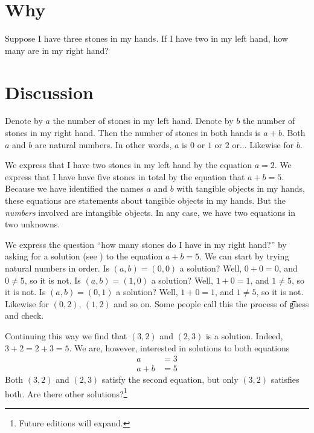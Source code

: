 
\section*{Why}

Suppose I have three stones in my hands.
If I have two in my left hand, how many are in my right hand?

\section*{Discussion}

Denote by $a$ the number of stones in my left hand.
Denote by $b$ the number of stones in my right hand.
Then the number of stones in both hands is $a + b$.
Both $a$ and $b$ are natural numbers.
In other words, $a$ is $0$ or $1$ or $2$ or...
Likewise for $b$.

We express that I have two stones in my left hand by the equation $a = 2$.
We express that I have have five stones in total by the equation that $a + b = 5$.
Because we have identified the names $a$ and $b$ with tangible objects in my hands, these equations are statements about tangible objects in my hands.
But the \textit{numbers} involved are intangible objects.
In any case, we have two equations in two unknowns.

We express the question ``how many stones do I have in my right hand?'' by asking for a solution (see ) to the equation $a + b = 5$.
We can start by trying natural numbers in order.
Is $(a, b) = (0, 0)$ a solution?
Well, $0 + 0 = 0$, and $0 \neq 5$, so it is not.
Is $(a, b) = (1, 0)$ a solution?
Well, $1 + 0 = 1$, and $1 \neq 5$, so it is not.
Is $(a, b) = (0, 1)$ a solution?
Well, $1 + 0 = 1$, and $1 \neq 5$, so it is not.
Likewise for $(0, 2)$, $(1, 2)$ and so on.
Some people call this the process of \t{guess and check}.

Continuing this way we find that $(3, 2)$ and $(2, 3)$ is a solution.
Indeed, $3 + 2 = 2 + 3 = 5$.
We are, however, interested in solutions to both equations
\[
\begin{aligned}
a &= 3 \\
a + b &= 5
\end{aligned}
\]
Both $(3, 2)$ and $(2, 3)$ satisfy the second equation, but only $(3, 2)$ satisfies both.
Are there other solutions?\footnote{Future editions will expand.}

\blankpage